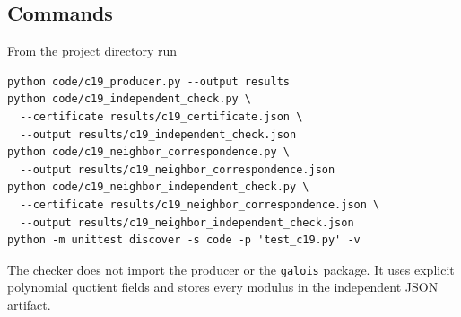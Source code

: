 \subsection{Commands}

From the project directory run
\begin{verbatim}
python code/c19_producer.py --output results
python code/c19_independent_check.py \
  --certificate results/c19_certificate.json \
  --output results/c19_independent_check.json
python code/c19_neighbor_correspondence.py \
  --output results/c19_neighbor_correspondence.json
python code/c19_neighbor_independent_check.py \
  --certificate results/c19_neighbor_correspondence.json \
  --output results/c19_neighbor_independent_check.json
python -m unittest discover -s code -p 'test_c19.py' -v
\end{verbatim}
The checker does not import the producer or the \texttt{galois} package.  It
uses explicit polynomial quotient fields and stores every modulus in the
independent JSON artifact.
